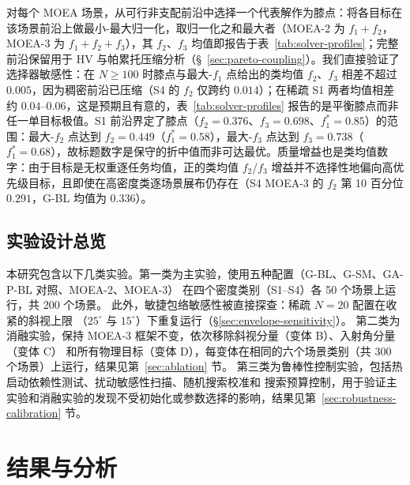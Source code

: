 \documentclass[preprint,12pt,authoryear]{elsarticle}
\begin{document}
对每个 MOEA 场景，从可行非支配前沿中选择一个代表解作为膝点：将各目标在该场景前沿上做最小-最大归一化，取归一化之和最大者（MOEA-2 为 $f_1+f_2$，MOEA-3 为 $f_1+f_2+f_3$），其 $f_2$、$f_3$ 均值即报告于表~\ref{tab:solver-profiles}；完整前沿保留用于 HV 与帕累托压缩分析（\S~\ref{sec:pareto-coupling}）。我们直接验证了选择器敏感性：在 $N\geq100$ 时膝点与最大-$f_1$ 点给出的类均值 $f_2$、$f_3$ 相差不超过 $0.005$，因为稠密前沿已压缩（S4 的 $f_2$ 仅跨约 $0.014$）；在稀疏 S1 两者均值相差约 $0.04$--$0.06$，这是预期且有意的，表~\ref{tab:solver-profiles} 报告的是平衡膝点而非任一单目标极值。S1 前沿界定了膝点（$f_2 = 0.376$、$f_3 = 0.698$、$f_1^* = 0.85$）的范围：最大-$f_2$ 点达到 $f_2 = 0.449$（$f_1^* = 0.58$），最大-$f_3$ 点达到 $f_3 = 0.738$（$f_1^* = 0.68$），故标题数字是保守的折中值而非可达最优。质量增益也是类均值数字：由于目标是无权重逐任务均值，正的类均值 $f_2$/$f_3$ 增益并不选择性地偏向高优先级目标，且即使在高密度类逐场景展布仍存在（S4 MOEA-3 的 $f_2$ 第 10 百分位 $0.291$，G-BL 均值为 $0.336$）。

\subsection{实验设计总览}
\label{sec:experiment-design}

本研究包含以下几类实验。第一类为主实验，使用五种配置（G-BL、G-SM、GA-P-BL 对照、MOEA-2、MOEA-3）
在四个密度类别（S1--S4）各 50 个场景上运行，共 200 个场景。
此外，敏捷包络敏感性被直接探查：稀疏 $N=20$ 配置在收紧的斜视上限
（$25^\circ$ 与 $15^\circ$）下重复运行（\S\ref{sec:envelope-sensitivity}）。
第二类为消融实验，保持 MOEA-3 框架不变，依次移除斜视分量（变体 B）、入射角分量（变体 C）
和所有物理目标（变体 D），每变体在相同的六个场景类别（共 300 个场景）上运行，结果见第~\ref{sec:ablation} 节。
第三类为鲁棒性控制实验，包括热启动依赖性测试、扰动敏感性扫描、随机搜索校准和
搜索预算控制，用于验证主实验和消融实验的发现不受初始化或参数选择的影响，结果见第~\ref{sec:robustness-calibration} 节。
\section{结果与分析}
\end{document}
